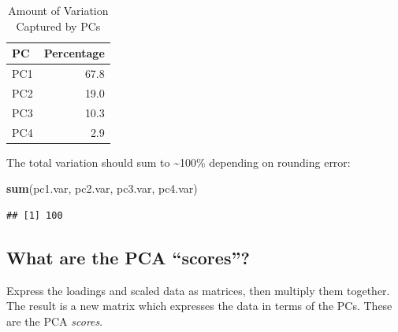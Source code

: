 \documentclass[]{article}
\newenvironment{Shaded}{\begin{snugshade}}{\end{snugshade}}
\newcommand{\CommentTok}[1]{\textcolor[rgb]{0.56,0.35,0.01}{\textit{#1}}}
\newcommand{\DataTypeTok}[1]{\textcolor[rgb]{0.13,0.29,0.53}{#1}}
\newcommand{\KeywordTok}[1]{\textcolor[rgb]{0.13,0.29,0.53}{\textbf{#1}}}
\newcommand{\NormalTok}[1]{#1}
\newcommand{\OperatorTok}[1]{\textcolor[rgb]{0.81,0.36,0.00}{\textbf{#1}}}
\newcommand{\StringTok}[1]{\textcolor[rgb]{0.31,0.60,0.02}{#1}}
\begin{document}
\begin{table}[t]

\caption{\label{tab:unnamed-chunk-9}Amount of Variation Captured by PCs}
\centering
\begin{tabular}{l|r}
\hline
PC & Percentage\\
\hline
PC1 & 67.8\\
\hline
PC2 & 19.0\\
\hline
PC3 & 10.3\\
\hline
PC4 & 2.9\\
\hline
\end{tabular}
\end{table}

The total variation should sum to \textasciitilde{}100\% depending on
rounding error:

\begin{Shaded}
\begin{Highlighting}[]
\KeywordTok{sum}\NormalTok{(pc1.var, pc2.var, pc3.var, pc4.var)}
\end{Highlighting}
\end{Shaded}

\begin{verbatim}
## [1] 100
\end{verbatim}

\hypertarget{what-are-the-pca-scores}{%
\subsection{What are the PCA
``scores''?}\label{what-are-the-pca-scores}}

Express the loadings and scaled data as matrices, then multiply them
together. The result is a new matrix which expresses the data in terms
of the PCs. These are the PCA \emph{scores}.

\begin{Shaded}
\end{Shaded}
\end{document}
